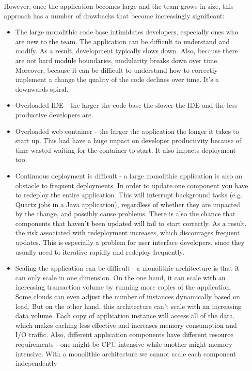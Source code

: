 However, once the application becomes large and the team grows in size, this approach has a number of drawbacks that become increasingly significant:

\begin{itemize}
    \item The large monolithic code base intimidates developers, especially ones who are new to the team. The application can be difficult to understand and modify. As a result, development typically slows down. Also, because there are not hard module boundaries, modularity breaks down over time. Moreover, because it can be difficult to understand how to correctly implement a change the quality of the code declines over time. It's a downwards spiral.

    \item Overloaded IDE - the larger the code base the slower the IDE and the less productive developers are.

    \item Overloaded web container - the larger the application the longer it takes to start up. This had have a huge impact on developer productivity because of time wasted waiting for the container to start. It also impacts deployment too.

    \item Continuous deployment is difficult - a large monolithic application is also an obstacle to frequent deployments. In order to update one component you have to redeploy the entire application. This will interrupt background tasks (e.g. Quartz jobs in a Java application), regardless of whether they are impacted by the change, and possibly cause problems. There is also the chance that components that haven't been updated will fail to start correctly. As a result, the risk associated with redeployment increases, which discourages frequent updates. This is especially a problem for user interface developers, since they usually need to iterative rapidly and redeploy frequently.

    \item Scaling the application can be difficult - a monolithic architecture is that it can only scale in one dimension. On the one hand, it can scale with an increasing transaction volume by running more copies of the application. Some clouds can even adjust the number of instances dynamically based on load. But on the other hand, this architecture can't scale with an increasing data volume. Each copy of application instance will access all of the data, which makes caching less effective and increases memory consumption and I/O traffic. Also, different application components have different resource requirements - one might be CPU intensive while another might memory intensive. With a monolithic architecture we cannot scale each component independently


\end{itemize}
